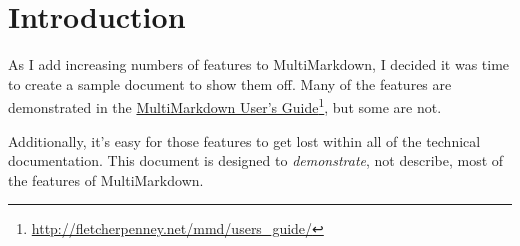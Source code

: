 
\def\mytitle{Sample MultiMarkdown Document}
\def\latexmode{memoir}
\def\keywords{MultiMarkdown, Markdown, XML, XHTML, XSLT, PDF}
\def\mycopyright{2011 Fletcher T. Penney.  \\
This work is licensed under a Creative Commons License.  \\
http:/\slash creativecommons.org\slash licenses\slash by-nc-sa\slash 3.0\slash }



\chapter{Introduction}
\label{introduction}

As I add increasing numbers of features to MultiMarkdown, I decided it was time to create a sample document to show them off. Many of the features are demonstrated in the \href{http://fletcherpenney.net/mmd/users_guide/}{MultiMarkdown User's Guide}\footnote{\href{http://fletcherpenney.net/mmd/users\_guide/}{http:/\slash fletcherpenney.net\slash mmd\slash users\_guide\slash }}, but some are not. 

Additionally, it's easy for those features to get lost within all of the technical documentation. This document is designed to \emph{demonstrate}, not describe, most of the features of MultiMarkdown. 




